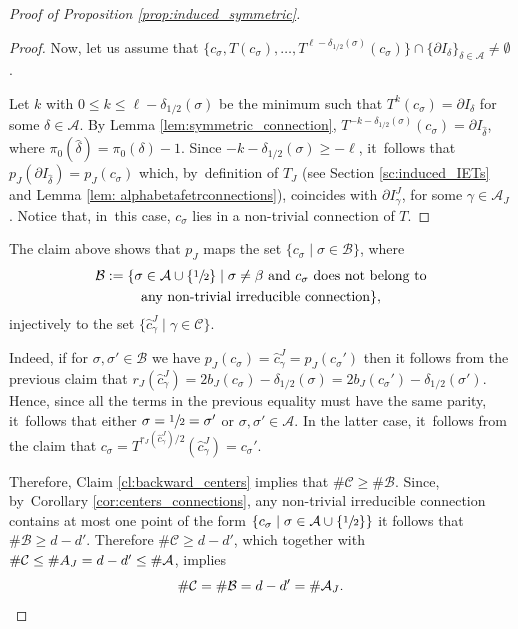 \documentclass[10pt,a4paper]{amsart}
\theoremstyle{plain}
\theoremstyle{definition}
\newcommand{\A}{\mathcal{A}}
\begin{document}
\begin{proof}[Proof of Proposition \ref{prop:induced_symmetric}]
\begin{proof}
Now, let us assume that $\{c_\sigma, T(c_\sigma), \ldots, T^{\ell - \delta_{1/2}(\sigma)}(c_\sigma)\} \cap \{\partial I_\delta\}_{\delta \in \A} \neq \emptyset$.

Let $k$ with $0 \leq k \leq \ell - \delta_{1/2}(\sigma)$ be the minimum such that $T^k(c_\sigma) = \partial I _\delta$ for some $\delta \in \A$. By Lemma \ref{lem:symmetric_connection}, $T^{-k - \delta_{1/2}(\sigma)}(c_\sigma) = \partial I_{\hat \delta}$, where $\pi_0(\hat \delta) = \pi_0(\delta) - 1$. Since $-k - \delta_{1/2}(\sigma) \geq -\ell$, it~follows that $p_J(\partial I_{\hat \delta}) = p_J(c_\sigma)$ which, by~definition of $T_J$ (see Section \ref{sc:induced_IETs} and Lemma \ref{lem: alphabetafetrconnections}), coincides with $\partial I_\gamma^J$, for some $\gamma \in \A_J$. Notice that, in~this case, $c_\sigma$ lies in a non-trivial connection of $T$.
\end{proof}

The claim above shows that $p_J$ maps the set $\{c _\sigma \mid \sigma \in \mathcal B\}$, where
\begin{multline*}
\mathcal{B} := \{\sigma \in \A \cup \{\sfrac{1}{2}\} \mid \sigma \neq \beta \text{ and } c_\sigma \text{ does not belong to}\\
\text{any non-trivial irreducible connection}\},
\end{multline*}
injectively to the set $\{\hat c_\gamma^J \mid \gamma \in \mathcal C\}$.

Indeed, if for $\sigma, \sigma' \in \mathcal B$ we have $p_J(c_\sigma) = \hat c_\gamma^J = p_J(c_\sigma')$ then it follows from the previous claim that $r_J(\hat c_\gamma^J) = 2b_J(c_\sigma) - \delta_{1/2}(\sigma) = 2b_J(c_\sigma') - \delta_{1/2}(\sigma')$. Hence, since all the terms in the previous equality must have the same parity, it~follows that either $\sigma = \sfrac{1}{2} = \sigma'$ or $\sigma, \sigma' \in \A$. In the latter case, it~follows from the claim that $c_\sigma = T^{r_J( \hat c_\gamma^J)/2}(\hat c_\gamma^J) = c_\sigma'$.

Therefore, Claim \ref{cl:backward_centers} implies that $\# \mathcal C \geq \# \mathcal B$. Since, by~Corollary \ref{cor:centers_connections}, any non-trivial irreducible connection contains at most one point of the form $\{c_\sigma \mid \sigma \in \A \cup \{\sfrac{1}{2}\}\}$ it follows that $\#\mathcal B \geq d - d'$. Therefore $\#\mathcal C \geq d - d'$, which together with $\#\mathcal C\le\#\mathcal \A_J = d - d' \le\#\mathcal A$, implies
\[
\# \mathcal C = \#\mathcal B = d - d' = \# \A_J.\qedhere
\]
\end{proof}
\end{document}
